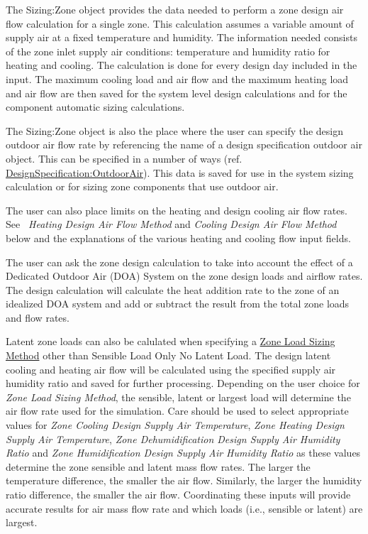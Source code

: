 The Sizing:Zone object provides the data needed to perform a zone design air flow calculation for a single zone. This calculation assumes a variable amount of supply air at a fixed temperature and humidity. The information needed consists of the zone inlet supply air conditions: temperature and humidity ratio for heating and cooling. The calculation is done for every design day included in the input. The maximum cooling load and air flow and the maximum heating load and air flow are then saved for the system level design calculations and for the component automatic sizing calculations.

The Sizing:Zone object is also the place where the user can specify the design outdoor air flow rate by referencing the name of a design specification outdoor air object. This can be specified in a number of ways (ref. \hyperref[designspecificationoutdoorair]{DesignSpecification:OutdoorAir}). This data is saved for use in the system sizing calculation or for sizing zone components that use outdoor air.

The user can also place limits on the heating and design cooling air flow rates. See \emph{~Heating Design Air Flow Method} and \emph{Cooling Design Air Flow Method} below and the explanations of the various heating and cooling flow input fields.

The user can ask the zone design calculation to take into account the effect of a Dedicated Outdoor Air (DOA) System on the zone design loads and airflow rates. The design calculation will calculate the heat addition rate to the zone of an idealized DOA system and add or subtract the result from the total zone loads and flow rates.

Latent zone loads can also be calulated when specifying a \hyperref[field-zone-load-sizing-method]{Zone Load Sizing Method} other than Sensible Load Only No Latent Load. The design latent cooling and heating air flow will be calculated using the specified supply air humidity ratio and saved for further processing. Depending on the user choice for \emph{Zone Load Sizing Method},  the sensible, latent or largest load will determine the air flow rate used for the simulation. Care should be used to select appropriate values for \emph{Zone Cooling Design Supply Air Temperature}, \emph{Zone Heating Design Supply Air Temperature}, \emph{Zone Dehumidification Design Supply Air Humidity Ratio} and \emph{Zone Humidification Design Supply Air Humidity Ratio} as these values determine the zone sensible and latent mass flow rates. The larger the temperature difference, the smaller the air flow. Similarly, the larger the humidity ratio difference, the smaller the air flow. Coordinating these inputs will provide accurate results for air mass flow rate and which loads (i.e., sensible or latent) are largest.

